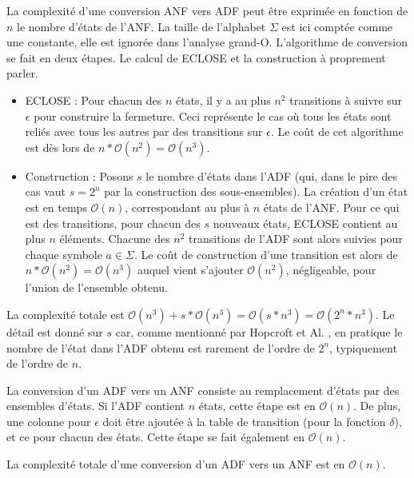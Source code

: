\begin{complexity}

	La complexité d'une conversion ANF vers ADF peut être exprimée en fonction de $n$ le nombre d'états de l'ANF. La taille de l'alphabet $\Sigma$ est ici comptée comme une constante, elle est ignorée dans l'analyse grand-O. L'algorithme de conversion se fait en deux étapes. Le calcul de ECLOSE et la construction à proprement parler.

	\begin{itemize}
		\item ECLOSE : Pour chacun des $n$ états, il y a au plus $n^2$ transitions à suivre sur $\epsilon$ pour construire la fermeture. Ceci représente le cas où tous les états sont reliés avec tous les autres par des transitions sur $\epsilon$. Le coût de cet algorithme est dès lors de $n*\mathcal{O}(n^2)=\mathcal{O}(n^3)$.

		\item Construction : Posons $s$ le nombre d'états dans l'ADF (qui, dans le pire des cas vaut $s=2^n$ par la construction des sous-ensembles). La création d'un état est en temps $\mathcal{O}(n)$, correspondant au plus à $n$ états de l'ANF. Pour ce qui est des transitions, pour chacun des $s$ nouveaux états, ECLOSE contient au plus $n$ éléments. Chacune des $n^2$ transitions de l'ADF sont alors suivies pour chaque symbole $a\in\Sigma$. Le coût de construction d'une transition est alors de $n*\mathcal{O}(n^2)=\mathcal{O}(n^3)$ auquel vient s'ajouter $\mathcal{O}(n^2)$, négligeable, pour l'union de l'ensemble obtenu.
	\end{itemize}

	La complexité totale est $\mathcal{O}(n^3) + s * \mathcal{O}(n^3) = \mathcal{O}(s*n^3) = \mathcal{O}(2^n*n^3)$.
	Le détail est donné sur $s$ car, comme mentionné par Hopcroft et Al. \cite{Hopcroft00}, en pratique le nombre de l'état dans l'ADF obtenu est rarement de l'ordre de $2^n$, typiquement de l'ordre de $n$.

\end{complexity}


\begin{complexity}
	La conversion d'un ADF \automaton vers un ANF consiste au remplacement d'états par des ensembles d'états. Si l'ADF contient $n$ états, cette étape est en $\mathcal{O}(n)$. De plus, une colonne pour $\epsilon$ doit être ajoutée à la table de transition (pour la fonction $\delta$), et ce pour chacun des états. Cette étape se fait également en $\mathcal{O}(n)$.

	La complexité totale d'une conversion d'un ADF vers un ANF est en $\mathcal{O}(n)$.
\end{complexity}
